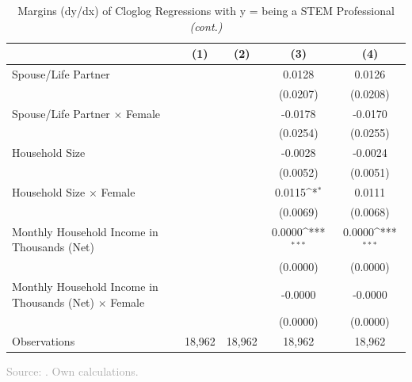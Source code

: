 \documentclass[11pt, aspectratio=1610, xcolor={dvipsnames}]{beamer}
\def\sym#1{\ifmmode^{#1}\else\(^{#1}\)\fi}
\begin{document}
	\begin{frame}
		\frametitle{}
		
		{\linespread{1}\tiny
			\begin{table}[h]
				\centering
				\caption{Margins (dy/dx) of Cloglog Regressions with y = being a STEM Professional \emph{(cont.)}}
				\label{tab:margins2}
				\begin{tabular}{p{25em}*{4}{c}}
					\toprule
					&\multicolumn{1}{c}{(1)}         &\multicolumn{1}{c}{(2)}         &\multicolumn{1}{c}{(3)}         &\multicolumn{1}{c}{(4)}         \\
					\midrule
					Spouse/Life Partner &                     &                     &      0.0128         &      0.0126         \\
					&                     &                     &    (0.0207)         &    (0.0208)         \\
					\addlinespace
					Spouse/Life Partner $\times$ Female&                     &                     &     -0.0178         &     -0.0170         \\
					&                     &                     &    (0.0254)         &    (0.0255)         \\
					\addlinespace
					Household Size      &                     &                     &     -0.0028         &     -0.0024         \\
					&                     &                     &    (0.0052)         &    (0.0051)         \\
					\addlinespace
					Household Size $\times$ Female&                     &                     &      0.0115\sym{*}  &      0.0111         \\
					&                     &                     &    (0.0069)         &    (0.0068)         \\
					\addlinespace
					Monthly Household Income in Thousands (Net)&                     &                     &      0.0000\sym{***}&      0.0000\sym{***}\\
					&                     &                     &    (0.0000)         &    (0.0000)         \\
					\addlinespace
					Monthly Household Income in Thousands (Net) $\times$ Female&                     &                     &     -0.0000         &     -0.0000         \\
					&                     &                     &    (0.0000)         &    (0.0000)         \\
					\midrule
					Observations        &       18,962         &       18,962         &       18,962         &       18,962         \\
					\bottomrule
				\end{tabular}
			\end{table}
		}
		
		{\scriptsize
			\textcolor{darkgray}{Source: \cite{SOEP2023}. Own calculations.}
		}
		
	\end{frame}
	
\end{document}
